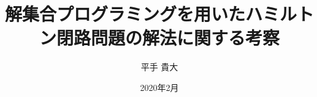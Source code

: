 \documentclass[a4paper,12pt,openany]{jbook}%
\title{解集合プログラミングを用いたハミルトン閉路問題の解法に関する考察}
\date{2020年2月}
\author{平手 貴大}
\begin{document}
\maketitle


\tableofcontents    %
\listoffigures      %
\listoftables       %
\lstlistoflistings  %









\end{document}
